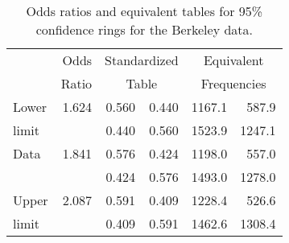 \begin{table}[htb]
\caption{Odds ratios and equivalent tables for 95\% confidence rings for the Berkeley data.}\label{tab:berkodds}
 \begin{center}
\begin{tabular}{lr|rr|rr}
\hline
   &      Odds    & \multicolumn{2}{c|}{Standardized} & \multicolumn{2}{c}{Equivalent}  \\
   &      Ratio   & \multicolumn{2}{c|}{Table}   &  \multicolumn{2}{c}{Frequencies} \\
\hline
%
%
Lower  &   1.624   &   0.560  & 0.440   & 1167.1  & 587.9  \\ 
limit  &           &   0.440  & 0.560   & 1523.9  & 1247.1 \\[2ex]
Data   &   1.841   &   0.576  & 0.424   & 1198.0  & 557.0  \\ 
       &           &   0.424  & 0.576   & 1493.0  & 1278.0  \\[2ex] 
Upper  &   2.087   &   0.591  & 0.409   & 1228.4  & 526.6   \\ 
limit  &           &   0.409  & 0.591   & 1462.6  & 1308.4  \\ 
\hline
\end{tabular}
\end{center}
\end{table}
